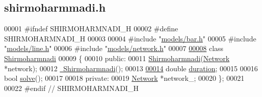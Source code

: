 \hypertarget{shirmoharmmadi_8h_source}{}\subsection{shirmoharmmadi.\+h}
\label{shirmoharmmadi_8h_source}

\begin{DoxyCode}
00001 \textcolor{preprocessor}{#ifndef SHIRMOHARMNADI\_H}
00002 \textcolor{preprocessor}{#define SHIRMOHARMNADI\_H}
00003 
00004 \textcolor{preprocessor}{#include "\hyperlink{bar_8h}{models/bar.h}"}
00005 \textcolor{preprocessor}{#include "\hyperlink{line_8h}{models/line.h}"}
00006 \textcolor{preprocessor}{#include "\hyperlink{network_8h}{models/network.h}"}
00007 
\hypertarget{shirmoharmmadi_8h_source_l00008}{}\hyperlink{class_shirmoharmnadi}{00008} \textcolor{keyword}{class }\hyperlink{class_shirmoharmnadi}{Shirmoharmnadi}
00009 \{
00010 \textcolor{keyword}{public}:
00011   \hyperlink{class_shirmoharmnadi_ad4f137b18ebbf42dfba31b60e0ab0b60}{Shirmoharmnadi}(\hyperlink{class_network}{Network} *network);
00012   \hyperlink{class_shirmoharmnadi_abcace04460fd4dfbc4f951ce2c7a59f7}{~Shirmoharmnadi}();
00013 
\hypertarget{shirmoharmmadi_8h_source_l00014}{}\hyperlink{class_shirmoharmnadi_a409966b1e7e6307e7cba066d1ef2d08e}{00014}   \textcolor{keywordtype}{double} \hyperlink{class_shirmoharmnadi_a409966b1e7e6307e7cba066d1ef2d08e}{duration};
00015 
00016   \textcolor{keywordtype}{bool} \hyperlink{class_shirmoharmnadi_a4cb21130795e4e0cedd887676f769171}{solve}();
00017 
00018 \textcolor{keyword}{private}:
00019   \hyperlink{class_network}{Network} *network\_;
00020 \};
00021 
00022 \textcolor{preprocessor}{#endif // SHIRMOHARMNADI\_H}
\end{DoxyCode}
